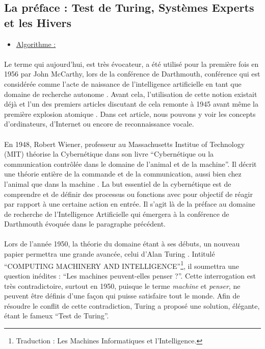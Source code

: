 \documentclass[10pt, french, a4paper]{report}
\begin{document}
\subsection{La préface : Test de Turing, Systèmes Experts et les Hivers}

\begin{itemize}
  \item \underline{Algorithme :}
\end{itemize}

\paragraph{}
Le terme qui aujourd’hui, est très évocateur, a été utilisé pour la première fois en 1956 par John McCarthy, lors de la conférence de Darthmouth, conférence qui est considérée comme l’acte de naissance de l’intelligence artificielle en tant que domaine de recherche autonome \citep{solomonoff_time_1985}. Avant cela, l'utilisation de cette notion existait déjà et l'un des premiers articles discutant de cela remonte à 1945 avant même la première explosion atomique \citep{bush_as_1945}. Dans cet article, nous pouvons y voir les concepts d'ordinateurs, d'Internet ou encore de reconnaissance vocale.

\paragraph{}
En 1948, Robert Wiener, professeur au Massachusetts Institue of Technology (MIT) théorise la Cybernétique dans son livre ``Cybernétique ou la communication contrôlée dans le domaine de l'animal et de la machine''. Il décrit une théorie entière de la commande et de la communication, aussi bien chez l'animal que dans la machine \citep{wiener_cybernetics;_1961}. La but essentiel de la cybernétique est de comprendre et de définir des processus ou fonctions avec pour objectif de réagir par rapport à une certaine action en entrée. Il s'agit là de la préface au domaine de recherche de l'Intelligence Artificielle qui émergera à la conférence de Darthmouth évoquée dans le paragraphe précédent.

\paragraph{}
Lors de l'année 1950, la théorie du domaine étant à ses débuts, un nouveau papier permettra une grande avancée, celui d'Alan Turing \citep{turing_i.computing_1950}. Intitulé ``COMPUTING MACHINERY AND INTELLIGENCE''\footnote{Traduction : Les Machines Informatiques et l'Intelligence.}, il soumettra une question inédites : ``Les machines peuvent-elles penser ?''. Cette interrogation est très contradictoire, surtout en 1950, puisque le terme \textit{machine} et \textit{penser}, ne peuvent être définis d’une façon qui puisse satisfaire tout le monde. Afin de résoudre le conflit de cette contradiction, Turing a proposé une solution, élégante, étant le fameux ``Test de Turing''. 
\end{document}

